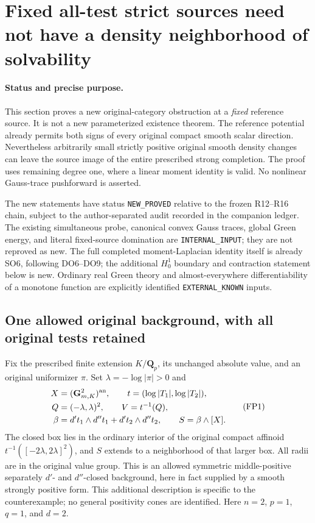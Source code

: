 \section{Fixed all-test strict sources need not have a density neighborhood of solvability}
\label{sec:r17-fixed-strict-source-nonopenness}

\paragraph{Status and precise purpose.}
This section proves a new original-category obstruction at a
\emph{fixed} reference source. It is not a new parameterized existence
theorem. The reference potential already permits both signs of every
original compact smooth scalar direction. Nevertheless arbitrarily
small strictly positive original smooth density changes can leave
the source image of the entire prescribed strong completion.
The proof uses remaining degree one, where a linear moment identity
is valid. No nonlinear Gauss-trace pushforward is asserted.

The new statements have status \texttt{NEW\_PROVED} relative to the
frozen R12--R16 chain, subject to the author-separated audit recorded
in the companion ledger. The existing simultaneous probe, canonical
convex Gauss traces, global Green energy, and literal fixed-source
domination are \texttt{INTERNAL\_INPUT}; they are not reproved as
new. The full completed moment-Laplacian identity itself is already
SO6, following DO6--DO9; the additional $H_0^1$ boundary and
contraction statement below is new. Ordinary real Green theory
and almost-everywhere differentiability of a monotone function
are explicitly identified \texttt{EXTERNAL\_KNOWN} inputs.

\subsection{One allowed original background, with all original tests retained}

Fix the prescribed finite extension $K/\mathbf Q_p$, its unchanged
absolute value, and an original uniformizer $\pi$. Set
$\lambda=-\log|\pi|>0$ and
\[
 \begin{split}
 X&=(\mathbf G_{m,K}^{2})^{\rm an},\qquad
 t=(\log|T_1|,\log|T_2|),\\
 Q&=(-\lambda,\lambda)^2,\qquad V=t^{-1}(Q),\\
 \beta&=d't_1\wedge d''t_1+d't_2\wedge d''t_2,
 \qquad S=\beta\wedge[X].
 \end{split}
 \tag{FP1}
\]
The closed box lies in the ordinary interior of the original compact
affinoid $t^{-1}([-2\lambda,2\lambda]^2)$, and $S$ extends to a
neighborhood of that larger box. All radii are in the original value
group. This is an allowed symmetric middle-positive separately
$d'$- and $d''$-closed background, here in fact supplied by a smooth
strongly positive form. This additional description is specific to
the counterexample; no general positivity cones are identified.
Here $n=2$, $p=1$, $q=1$, and $d=2$.

